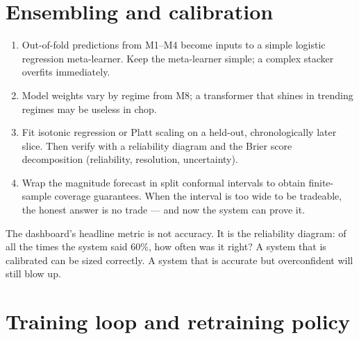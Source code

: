 \section{Ensembling and calibration}

\begin{enumerate}
\item {} Out-of-fold predictions from
M1--M4 become inputs to a simple logistic regression meta-learner. Keep the
meta-learner simple; a complex stacker overfits immediately.
\item {} Model weights vary by regime from M8;
a transformer that shines in trending regimes may be useless in chop.
\item {} Fit isotonic regression or Platt scaling on
a held-out, chronologically later slice. Then verify with a reliability diagram
and the Brier score decomposition (reliability, resolution, uncertainty).
\item {} Wrap the magnitude forecast in split conformal
intervals to obtain finite-sample coverage guarantees. When the interval is too
wide to be tradeable, the honest answer is no trade --- and now the system can
prove it.
\end{enumerate}

\begin{keybox}[title={The calibration contract}]
The dashboard's headline metric is not accuracy. It is the reliability diagram:
of all the times the system said 60\%, how often was it right? A system that is
calibrated can be sized correctly. A system that is accurate but overconfident
will still blow up.
\end{keybox}

\section{Training loop and retraining policy}

